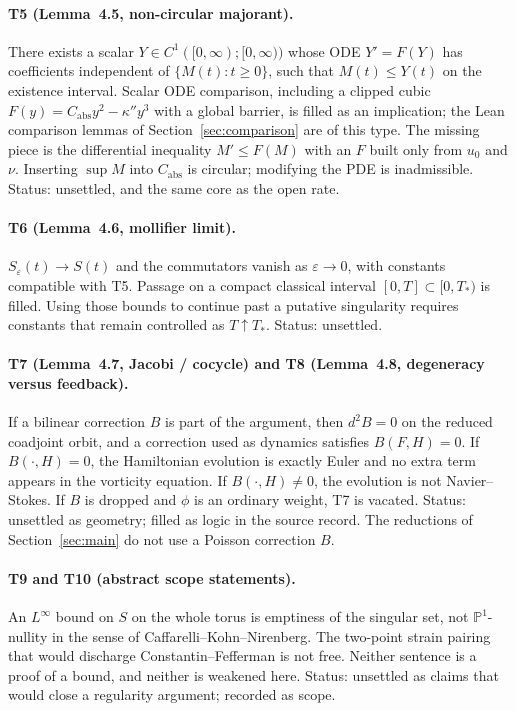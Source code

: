 \documentclass[11pt,a4paper]{article}
\theoremstyle{definition}
\theoremstyle{remark}
\begin{document}
\paragraph{T5 (Lemma~4.5, non-circular majorant).}
There exists a scalar $Y\in C^{1}([0,\infty);[0,\infty))$ whose ODE $Y'=F(Y)$ has coefficients independent of $\{M(t):t\ge 0\}$, such that $M(t)\le Y(t)$ on the existence interval. Scalar ODE comparison, including a clipped cubic $F(y)=C_{\mathrm{abs}}y^{2}-\kappa'' y^{3}$ with a global barrier, is filled as an implication; the Lean comparison lemmas of Section~\ref{sec:comparison} are of this type. The missing piece is the differential inequality $M'\le F(M)$ with an $F$ built only from $u_0$ and $\nu$. Inserting $\sup M$ into $C_{\mathrm{abs}}$ is circular; modifying the PDE is inadmissible. Status: unsettled, and the same core as the open rate.

\paragraph{T6 (Lemma~4.6, mollifier limit).}
$S_{\varepsilon}(t)\to S(t)$ and the commutators vanish as $\varepsilon\to 0$, with constants compatible with T5. Passage on a compact classical interval $[0,T]\subset[0,T_{\ast})$ is filled. Using those bounds to continue past a putative singularity requires constants that remain controlled as $T\uparrow T_{\ast}$. Status: unsettled.

\paragraph{T7 (Lemma~4.7, Jacobi / cocycle) and T8 (Lemma~4.8, degeneracy versus feedback).}
If a bilinear correction $B$ is part of the argument, then $d^{2}B=0$ on the reduced coadjoint orbit, and a correction used as dynamics satisfies $B(F,H)=0$. If $B(\cdot,H)=0$, the Hamiltonian evolution is exactly Euler and no extra term appears in the vorticity equation. If $B(\cdot,H)\neq 0$, the evolution is not Navier--Stokes. If $B$ is dropped and $\phi$ is an ordinary weight, T7 is vacated. Status: unsettled as geometry; filled as logic in the source record. The reductions of Section~\ref{sec:main} do not use a Poisson correction $B$.

\paragraph{T9 and T10 (abstract scope statements).}
An $L^\infty$ bound on $S$ on the whole torus is emptiness of the singular set, not $\mathbb{P}^{1}$-nullity in the sense of Caffarelli--Kohn--Nirenberg. The two-point strain pairing that would discharge Constantin--Fefferman is not free. Neither sentence is a proof of a bound, and neither is weakened here. Status: unsettled as claims that would close a regularity argument; recorded as scope.
\end{document}
